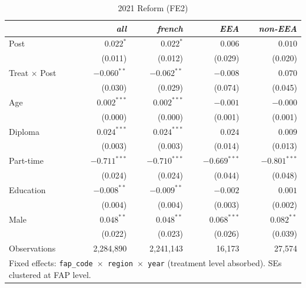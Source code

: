 \documentclass[10pt, a4paper]{article}
\begin{document}
\begin{table}[h!]
\caption{2021 Reform (FE2)\label{tab:did2021_fe2}}
\centering
\setlength{\tabcolsep}{25pt}
\begin{tabular}{lrrrr}
 & \textit{all} & \textit{french} & \textit{EEA} & \textit{non-EEA} \\
\midrule
\midrule
Post & $0.022^{*}$ & $0.022^{*}$ & $0.006$ & $0.010$ \\
 & (0.011) & (0.012) & (0.029) & (0.020) \\[2pt]
Treat$\,\times\,$Post & $-0.060^{**}$ & $-0.062^{**}$ & $-0.008$ & $0.070$ \\
 & (0.030) & (0.029) & (0.074) & (0.045) \\[2pt]
\midrule
Age & $0.002^{***}$ & $0.002^{***}$ & $-0.001$ & $-0.000$ \\
 & (0.000) & (0.000) & (0.001) & (0.001) \\[2pt]
Diploma & $0.024^{***}$ & $0.024^{***}$ & $0.024$ & $0.009$ \\
 & (0.003) & (0.003) & (0.014) & (0.013) \\[2pt]
Part-time & $-0.711^{***}$ & $-0.710^{***}$ & $-0.669^{***}$ & $-0.801^{***}$ \\
 & (0.024) & (0.024) & (0.044) & (0.048) \\[2pt]
Education & $-0.008^{**}$ & $-0.009^{**}$ & $-0.002$ & $0.001$ \\
 & (0.004) & (0.004) & (0.003) & (0.002) \\[2pt]
Male & $0.048^{**}$ & $0.048^{**}$ & $0.068^{***}$ & $0.082^{**}$ \\
 & (0.022) & (0.023) & (0.026) & (0.039) \\[2pt]
\midrule
Observations & 2{,}284{,}890 & 2{,}241{,}143 & 16{,}173 & 27{,}574 \\
\bottomrule
\multicolumn{5}{p{0.88\linewidth}}{\footnotesize Fixed effects: \texttt{fap\_code $\times$ region $\times$ year} (treatment level absorbed). SEs clustered at FAP level.}\\
\end{tabular}
\end{table}
\clearpage
\end{document}
